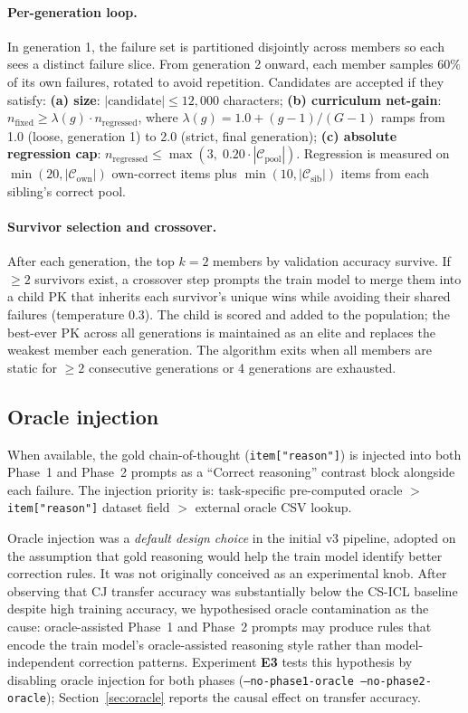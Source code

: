 \documentclass{article}
\begin{document}
\paragraph{Per-generation loop.}
In generation 1, the failure set is partitioned disjointly across members so each sees a
distinct failure slice.
From generation 2 onward, each member samples $60\%$ of its own failures, rotated to
avoid repetition.
Candidates are accepted if they satisfy:
\textbf{(a) size}: $|\text{candidate}| \leq 12{,}000$ characters;
\textbf{(b) curriculum net-gain}: $n_\text{fixed} \geq \lambda(g) \cdot n_\text{regressed}$,
where $\lambda(g) = 1.0 + (g-1)/(G-1)$ ramps from 1.0 (loose, generation 1) to 2.0
(strict, final generation);
\textbf{(c) absolute regression cap}: $n_\text{regressed} \leq \max\!\left(3,\;
0.20 \cdot |\mathcal{C}_\text{pool}|\right)$.
Regression is measured on $\min(20,|\mathcal{C}_\text{own}|)$ own-correct items plus
$\min(10,|\mathcal{C}_\text{sib}|)$ items from each sibling's correct pool.

\paragraph{Survivor selection and crossover.}
After each generation, the top $k=2$ members by validation accuracy survive.
If $\geq 2$ survivors exist, a crossover step prompts the train model to merge them into a
child PK that inherits each survivor's unique wins while avoiding their shared failures
(temperature 0.3).
The child is scored and added to the population; the best-ever PK across all generations is
maintained as an elite and replaces the weakest member each generation.
The algorithm exits when all members are static for $\geq 2$ consecutive generations or
4 generations are exhausted.

\subsection{Oracle injection}
\label{sec:oracle_method}

When available, the gold chain-of-thought (\texttt{item["reason"]}) is injected into both
Phase~1 and Phase~2 prompts as a ``Correct reasoning'' contrast block alongside each failure.
The injection priority is: task-specific pre-computed oracle $>$ \texttt{item["reason"]}
dataset field $>$ external oracle CSV lookup.

Oracle injection was a \emph{default design choice} in the initial v3 pipeline, adopted
on the assumption that gold reasoning would help the train model identify better correction
rules.
It was not originally conceived as an experimental knob.
After observing that CJ transfer accuracy was substantially below the CS-ICL baseline
despite high training accuracy, we hypothesised oracle contamination as the cause:
oracle-assisted Phase~1 and Phase~2 prompts may produce rules that encode
the train model's oracle-assisted reasoning style rather than model-independent
correction patterns.
Experiment \textbf{E3} tests this hypothesis by disabling oracle injection for both phases
(\texttt{--no-phase1-oracle --no-phase2-oracle}); Section~\ref{sec:oracle} reports the
causal effect on transfer accuracy.
\end{document}
